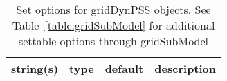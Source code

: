 \begin{table}[ht]
\centering
\begin{tabular}{p{5cm} c c p{7cm}}
\hline
string(s) & type & default & description \\
\hline
\hline
\end{tabular}
\caption{Set options for gridDynPSS objects. See Table~\ref{table:gridSubModel} for additional settable options through gridSubModel}
\label{table:gridDynPSS}
\end{table}
